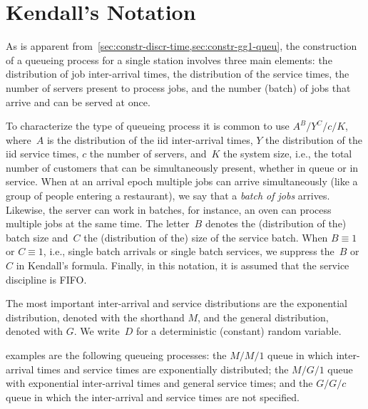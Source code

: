 \documentclass[queueing-book.tex]{subfiles}
\begin{document}
\section{Kendall's Notation}
\label{sec:kendalls-notation}

As is apparent from~\cref{sec:constr-discr-time,sec:constr-gg1-queu}, the construction of a queueing process for a single station involves three main elements: the distribution of job inter-arrival times, the distribution of the service times, the number of servers present to process jobs, and the number (batch) of jobs that arrive and can be served at once.


To characterize the type of queueing process it is common to use  $A^{B}/Y^{C}/c/K$, where~$A$ is the distribution of the iid inter-arrival times,
$Y$ the distribution of the iid service times, $c$ the number of servers, and~$K$ the system size, i.e., the total number of customers that can be simultaneously present, whether in queue or in service.
When at an arrival epoch multiple jobs can arrive simultaneously (like a group of people entering a restaurant), we say that a \emph{batch of jobs} arrives.
Likewise, the server can work in batches, for instance, an oven can  process multiple jobs at the same time.
The letter~$B$ denotes  the (distribution of the) batch size and~$C$ the (distribution of the) size of the service batch.
When $B\equiv 1$ or $C \equiv 1$, i.e., single batch arrivals or single batch services, we suppress the~$B$ or~$C$ in Kendall's formula.
Finally, in this notation, it is assumed that the service discipline is FIFO.


The most important inter-arrival and service distributions are the exponential distribution, denoted with the shorthand  $M$, and the general distribution,  denoted with  $G$. We write~$D$ for a deterministic (constant) random variable.

 examples are the following queueing processes: the $M/M/1$ queue in which inter-arrival times and service times are exponentially distributed;  the $M/G/1$ queue with exponential inter-arrival times and general service times; and the $G/G/c$ queue in which the inter-arrival and service times are not specified.
\end{document}
